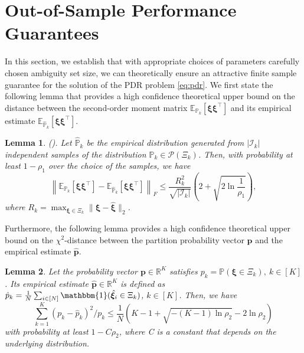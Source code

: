 \documentclass{article}
\newcommand{\PP}{\mathbb{P}}
\newcommand{\EE}{\mathbb{E}}
\newcommand{\RR}{\mathbb{R}}
\newtheorem{lemma}{Lemma}
\begin{document}
\section{Out-of-Sample Performance Guarantees}
\label{performance_guarantee}
In this section, we establish that with appropriate choices of parameters  carefully chosen ambiguity set size, we can theoretically ensure an attractive finite sample guarantee for the solution of the PDR problem \eqref{eq:pdr}. We first state the following lemma that provides  a high confidence theoretical upper bound on the distance between the second-order moment matrix $\EE_{\PP_k} [\bm\xi\bm\xi^\top]$ and its empirical estimate $\EE_{{\hat{\PP}}_k} [\bm\xi\bm\xi^\top]$. 

\begin{lemma} \textup{(\cite[Corollary 5]{second-moment-bound}).} \label{lem4}
Let ${\hat{\PP}}_k$ be the empirical distribution generated from  $|\mathcal{I}_k|$ independent samples of the distribution $\PP_k \in \mathcal{P} (\Xi_k)$. Then, with probability at least $1-\rho_1$ over the choice of the samples, we have
\begin{equation*}
\left\| \EE_{\PP_k} [\bm\xi\bm\xi^\top] - \EE_{{\hat{\PP}}_k} [\bm\xi\bm\xi^\top] \right\|_F\leq \frac{R_k^2}{\sqrt{|\mathcal{I}_k|}}\left(2+\sqrt{2\ln\frac{1}{\rho_1}}\right),
\end{equation*}
where $R_k=\max_{\bm\xi\in\Xi_k}\|\bm\xi - \hat{\bm \xi} \|_2$. %
\end{lemma}

Furthermore, the following lemma provides a high confidence theoretical upper bound on the $\chi^2$-distance between the partition probability vector $\bm p$ and the empirical estimate $\hat{\bm p}$. 



\begin{lemma} \label{lem5}
Let the probability vector $\bm p \in \RR^K$ satisfies $p_k = \PP(\bm \xi \in \Xi_k), \ k \in [K]$. Its empirical estimate $\hat{\bm p} \in \RR^K$ is defined as $\hat{p}_k = \tfrac{1}{N}\sum_{i \in [N]}\mathbbm{1}(\hat{\bm \xi}_i \in \Xi_k)$, $k \in [K]$. Then, we have
\begin{equation}
\label{ineq:probability-bound}
\sum_{k = 1}^{K} (p_k - \hat{p}_k)^2/p_k \leq \frac{1}{N}(K - 1 + \sqrt{-(K-1) \ln{\rho_2}} - 2\ln \rho_2)
\end{equation}
with probability at least $1-C\rho_2$, where C is a constant that depends on the underlying distribution.
\end{lemma}
\end{document}

